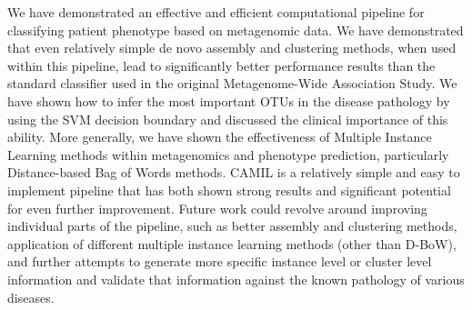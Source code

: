 
We have demonstrated an effective and efficient computational pipeline for classifying patient phenotype based on metagenomic data. We have demonstrated that even relatively simple de novo assembly and clustering methods, when used within this pipeline, lead to significantly better performance results than the standard classifier used in the original Metagenome-Wide Association Study. We have shown how to infer the most important OTUs in the disease pathology by using the SVM decision boundary and discussed the clinical importance of this ability. More generally, we have shown the effectiveness of Multiple Instance Learning methods within metagenomics and phenotype prediction, particularly Distance-based Bag of Words methods. CAMIL is a relatively simple and easy to implement pipeline that has both shown strong results and significant potential for even further improvement. Future work could revolve around improving individual parts of the pipeline, such as better assembly and clustering methods, application of different multiple instance learning methods (other than D-BoW), and further attempts to generate more specific instance level or cluster level information and validate that information against the known pathology of various diseases.